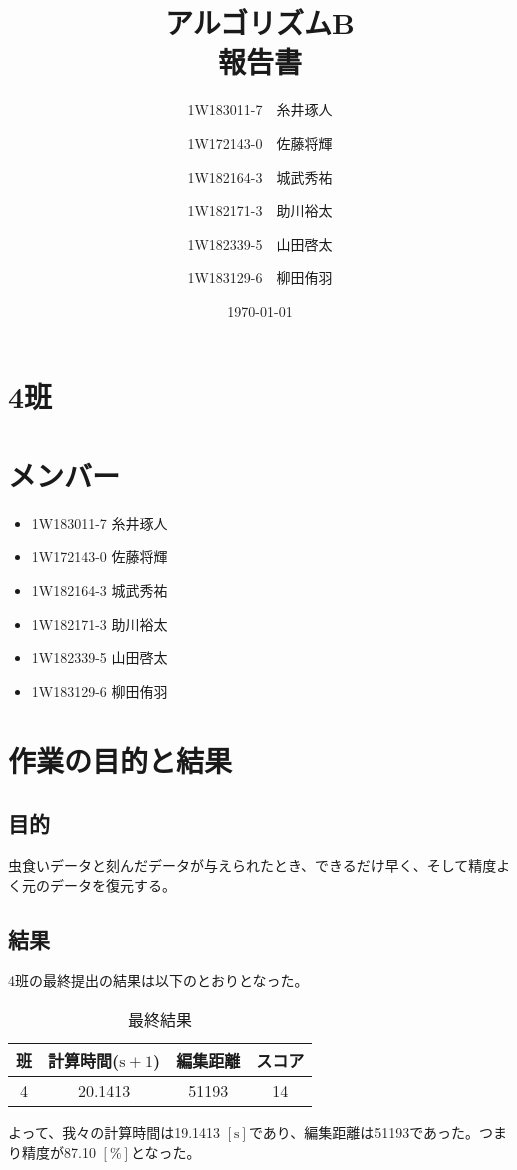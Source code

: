 \documentclass[uplatex]{jsarticle}
\title{アルゴリズムB\\報告書}
\author{1W183011-7　糸井琢人\and 1W172143-0　佐藤将輝\and 1W182164-3　城武秀祐\and 1W182171-3　助川裕太\and 1W182339-5　山田啓太\and 1W183129-6　柳田侑羽}
\date{\today}
\begin{document}
    \maketitle
    \section{4班}

    \section{メンバー}
    \begin{itemize}
        \item 1W183011-7 糸井琢人
        \item 1W172143-0 佐藤将輝
        \item 1W182164-3 城武秀祐
        \item 1W182171-3 助川裕太
        \item 1W182339-5 山田啓太
        \item 1W183129-6 柳田侑羽
    \end{itemize}

    \section{作業の目的と結果}
    \subsection{目的}
    虫食いデータと刻んだデータが与えられたとき、できるだけ早く、そして精度よく元のデータを復元する。

    \subsection{結果}
    4班の最終提出の結果は以下のとおりとなった。
    \begin{table}[H]
        \centering
        \caption{最終結果}
        \label{results}
        \begin{tabular}{c|c|c|c}\hline\hline
            班&計算時間($\mathrm{s+1}$)&編集距離&スコア\\\hline
            4&20.1413&51193&14\\\hline
        \end{tabular}
    \end{table}
    よって、我々の計算時間は19.1413 $\mathrm{[s]}$であり、編集距離は51193であった。つまり精度が87.10 $\mathrm{[\%]}$となった。
\end{document}
